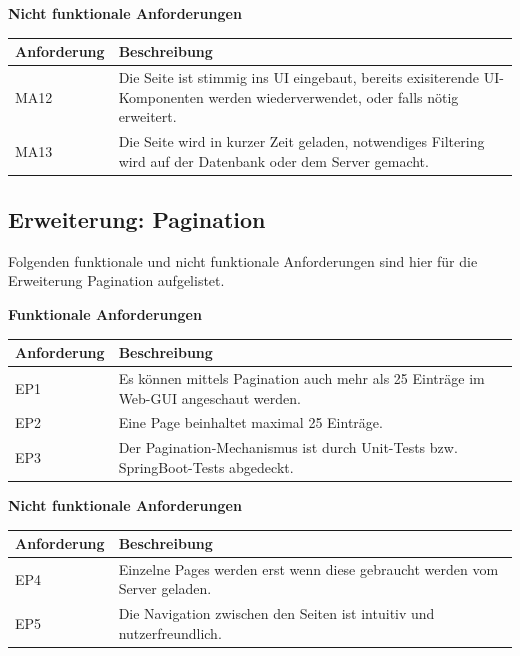 \noindent \textbf{Nicht funktionale Anforderungen}\newline

\noindent \begin{tabular}{|p{3cm}|p{12cm}|}
	\hline
	\textbf{Anforderung}  & \textbf{Beschreibung} \\ \hline
	MA12    & Die Seite ist stimmig ins UI eingebaut, bereits exisiterende UI-Komponenten werden wiederverwendet, oder falls nötig erweitert.     \\ \hline
	MA13    & Die Seite wird in kurzer Zeit geladen, notwendiges Filtering wird auf der Datenbank oder dem Server gemacht.     \\ \hline
\end{tabular}

\subsection{Erweiterung: Pagination}
Folgenden funktionale und nicht funktionale Anforderungen sind hier für die Erweiterung Pagination aufgelistet.

\textbf{Funktionale Anforderungen}\newline

\noindent \begin{tabular}{|p{3cm}|p{12cm}|}
	\hline
	\textbf{Anforderung}  & \textbf{Beschreibung} \\ \hline
	EP1    & Es können mittels Pagination auch mehr als 25 Einträge im Web-GUI angeschaut werden.     \\ \hline
	EP2    & Eine Page beinhaltet maximal 25 Einträge.     \\ \hline
	EP3    & Der Pagination-Mechanismus ist durch Unit-Tests bzw. SpringBoot-Tests abgedeckt.     \\ \hline
\end{tabular} \newline

\noindent \textbf{Nicht funktionale Anforderungen}\newline

\noindent \begin{tabular}{|p{3cm}|p{12cm}|}
	\hline
	\textbf{Anforderung}  & \textbf{Beschreibung} \\ \hline
	EP4    & Einzelne Pages werden erst wenn diese gebraucht werden vom Server geladen.     \\ \hline
	EP5    & Die Navigation zwischen den Seiten ist intuitiv und nutzerfreundlich.     \\ \hline
\end{tabular}


